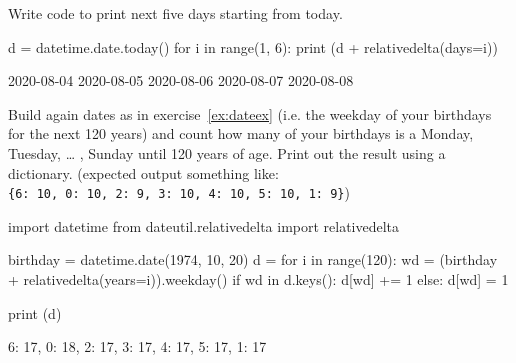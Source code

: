 \begin{question}
Write code to print next five days starting from today.
\end{question}

\cprotEnv\begin{solution}
\begin{ipython}
d = datetime.date.today()
for i in range(1, 6):
     print (d + relativedelta(days=i))
\end{ipython}
\begin{ioutput}
2020-08-04
2020-08-05
2020-08-06
2020-08-07
2020-08-08
\end{ioutput}
\end{solution}

\begin{question}
Build again dates as in exercise~\ref{ex:dateex} (i.e. the weekday of your birthdays for the next 120 years) and count how many of your birthdays is a Monday, Tuesday, \ldots{} , Sunday until 120 years of age. Print out the result using a dictionary. (expected output something like: \texttt{\{6:\ 10,\ 0:\ 10,\ 2:\ 9,\ 3:\ 10,\ 4:\ 10,\ 5:\ 10,\ 1:\ 9\}})
\end{question}

\cprotEnv\begin{solution}
\begin{ipython}
import datetime
from dateutil.relativedelta import relativedelta

birthday = datetime.date(1974, 10, 20)
d = {}
for i in range(120):
    wd = (birthday + relativedelta(years=i)).weekday() 
    if wd in d.keys():
        d[wd] += 1
    else:
        d[wd] = 1
        
print (d)
\end{ipython}
\begin{ioutput}
{6: 17, 0: 18, 2: 17, 3: 17, 4: 17, 5: 17, 1: 17}
\end{ioutput}
\end{solution}

